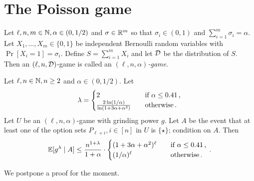 
\section{The Poisson game}
  \begin{definition}\label{def:xor-game-poisson}
      Let $\ell, n, m \in \mathbb{N}, \alpha \in (0, 1/2)$ and 
      $\sigma \in \mathbb{R}^m$ so that $\sigma_i \in (0, 1)$ and $\sum_{i=1}^m \sigma_i = \alpha$. 
      Let $X_1, \ldots, X_m \in \{0,1\}$ be independent Bernoulli random variables with 
      $\Pr[X_i = 1] = \sigma_i$. 
      Define $S = \sum_{i = 1}^m X_i$ 
      and let $\mathcal{D}$ be the distribution of $S$.
      Then an $(\ell, n, \mathcal{D})$-game is called an 
      \emph{$(\ell, n, \alpha)$-game}.
  \end{definition}


  \begin{theorem}\label{thm:xor-game-private-election}
      Let $\ell, n \in \mathbb{N}, n \geq 2$ and $\alpha \in (0, 1/2)$. 
      Let
      \begin{equation}\label{eq:lambda-star-poisson}
          \lambda = \begin{cases}
              2 & \quad\text{if $\alpha \leq 0.41$\,,}\\
              \frac{2 \ln(1/\alpha)}{\ln(1+3\alpha+\alpha^2)} &\quad\text{otherwise\,.}
          \end{cases}
      \end{equation}
      Let $U$ be an $(\ell, n, \alpha)$-game with grinding power $g$. 
      Let $A$ be the event that 
      at least one of the option sets $P_{\ell + i}, i \in [n]$ in $U$ is $\{\star\}$; 
      condition on $A$. 
      Then 
      $$
          \operatorname{\mathbb{E}}[g^\lambda \mid A] 
          \leq \frac{n^{1 + \lambda} }{1+\alpha} 
          \cdot \begin{cases}
              (1 + 3 \alpha + \alpha^2)^{\ell} &\quad\text{if $\alpha \leq 0.41$\,,} \\
              (1/\alpha)^\ell &\quad\text{otherwise\,.}
          \end{cases}
          \,.
      $$
  \end{theorem}
  We postpone a proof for the moment.



